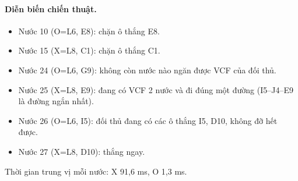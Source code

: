 \paragraph{Diễn biến chiến thuật.}
\begin{itemize}\footnotesize\linespread{1.1}\selectfont
\setlength{\itemsep}{0pt}
  \item Nước 10 (O=L6, E8): chặn ô thắng E8.
  \item Nước 15 (X=L8, C1): chặn ô thắng C1.
  \item Nước 24 (O=L6, G9): không còn nước nào ngăn được VCF của đối thủ.
  \item Nước 25 (X=L8, E9): đang có VCF 2 nước và đi đúng một đường (I5--J4--E9 là đường ngắn nhất).
  \item Nước 26 (O=L6, I5): đối thủ đang có các ô thắng I5, D10, không đỡ hết được.
  \item Nước 27 (X=L8, D10): thắng ngay.
\end{itemize}
Thời gian trung vị mỗi nước: X 91,6 ms, O 1,3 ms.
\clearpage

